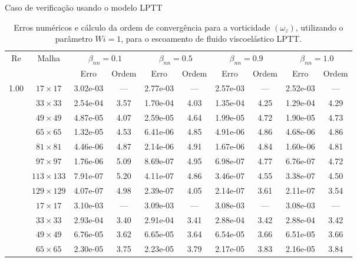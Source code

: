 \begin{frame}{Caso de verificação usando o modelo LPTT}
    \centering
    \begin{table}[H]
\caption{Erros numéricos e cálculo da ordem de convergência para a vorticidade $(\omega_{z})$, utilizando o parâmetro $Wi=1$, para o escoamento de fluido viscoelástico LPTT.\label{tab_LPTTWzResumida_2}}
\scriptsize{
    \begin{tabular*}{\textwidth}{@{\extracolsep\fill}cccccccccc@{}}
    \hline
    \multirow{2}{*}{$\operatorname{Re}$} & \multirow{2}{*}{Malha} & \multicolumn{2}{c}{$\beta_{nn}=0.1$}  & \multicolumn{2}{c}{$\beta_{nn}=0.5$}  & \multicolumn{2}{c}{$\beta_{nn}=0.9$}  & \multicolumn{2}{c}{$\beta_{nn}=1.0$}\\ %
     & & Erro & Ordem & Erro & Ordem & Erro & Ordem & Erro & Ordem \\
    \hline
    \multirow{10}{*}{1.00} & $17\times 17$ & 3.02e-03 & --- & 2.77e-03 & --- & 2.57e-03 & --- & 2.52e-03 & --- \\
    & $33\times 33$ & 2.54e-04 & 3.57 & 1.70e-04 & 4.03 & 1.35e-04 & 4.25 & 1.29e-04 & 4.29 \\
    & $49\times 49$ & 4.87e-05 & 4.07 & 2.59e-05 & 4.64 & 1.99e-05 & 4.72 & 1.90e-05 & 4.73 \\
    & $65\times 65$ & 1.32e-05 & 4.53 & 6.41e-06 & 4.85 & 4.91e-06 & 4.86 & 4.68e-06 & 4.86 \\
    & $81\times 81$ & 4.46e-06 & 4.87 & 2.14e-06 & 4.91 & 1.67e-06 & 4.84 & 1.60e-06 & 4.81 \\
    & $97\times 97$ & 1.76e-06 & 5.09 & 8.69e-07 & 4.95 & 6.98e-07 & 4.77 & 6.76e-07 & 4.72 \\
    & $113\times 133$ & 7.91e-07 & 5.20 & 4.11e-07 & 4.86 & 3.46e-07 & 4.55 & 3.38e-07 & 4.50 \\
    & $129\times 129$ & 4.07e-07 & 4.98 & 2.39e-07 & 4.05 & 2.14e-07 & 3.61 & 2.11e-07 & 3.54 \\
    \hline
    \multirow{10}{*}{100.00} & $17\times 17$ & 3.10e-03 & --- & 3.09e-03 & --- & 3.08e-03 & --- & 3.08e-03 & --- \\
    & $33\times 33$ & 2.93e-04 & 3.40 & 2.91e-04 & 3.41 & 2.88e-04 & 3.42 & 2.88e-04 & 3.42 \\
    & $49\times 49$ & 6.76e-05 & 3.62 & 6.65e-05 & 3.64 & 6.54e-05 & 3.66 & 6.51e-05 & 3.66 \\
    & $65\times 65$ & 2.30e-05 & 3.75 & 2.23e-05 & 3.79 & 2.17e-05 & 3.83 & 2.16e-05 & 3.84 \\

\end{tabular*}}
\end{table}
\end{frame}
